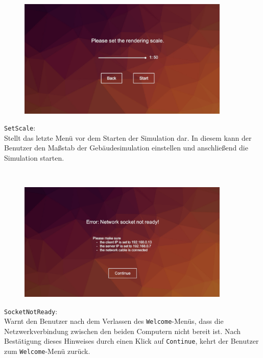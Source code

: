 \begin{minipage}{0.6\textwidth}
	\begin{figure}[H] 
		\includegraphics[trim=3.5cm 1cm 2.5cm 3cm, clip, width=0.9\textwidth]{Bilder/SetScale.jpg}
			\label{fig:SetScale}
	\end{figure}
\end{minipage}
\begin{minipage}{0.4\textwidth}
	\texttt{SetScale}:\\
	Stellt das letzte Menü vor dem Starten der Simulation dar. In diesem kann der Benutzer den Maßstab der Gebäudesimulation einstellen und anschließend die Simulation starten.
\end{minipage}\\

\begin{minipage}{0.6\textwidth}
	\begin{figure}[H] 
		\includegraphics[trim=3cm 1cm 3cm 3cm, clip, width=0.9\textwidth]{Bilder/SocketNotReady.jpg}
			\label{fig:SocketNotReady}
	\end{figure}
\end{minipage}
\begin{minipage}{0.4\textwidth}
	\texttt{SocketNotReady}:\\
	Warnt den Benutzer nach dem Verlassen des \texttt{Welcome}-Menüs, dass die Netzwerkverbindung zwischen den beiden Computern nicht bereit ist. Nach Bestätigung dieses Hinweises durch einen Klick auf \texttt{Continue}, kehrt der Benutzer zum \texttt{Welcome}-Menü zurück. %
\end{minipage}\\

